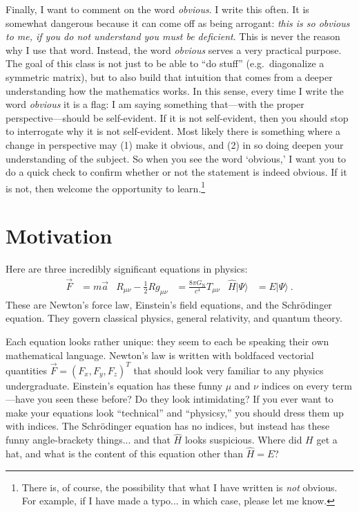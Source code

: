 \documentclass[12pt]{article}
\begin{document}
Finally, I want to comment on the word \emph{obvious}. I write this often. It is somewhat dangerous because it can come off as being arrogant: \emph{this is so obvious to me, if you do not understand you must be deficient}. This is never the reason why I use that word. Instead, the word \emph{obvious} serves a very practical purpose. The goal of this class is not just to be able to ``do stuff'' (e.g.~diagonalize a symmetric matrix), but to also build that intuition that comes from a deeper understanding how the mathematics works. In this sense, every time I write the word \emph{obvious} it is a flag: I am saying something that---with the proper perspective---should be self-evident. If it is not self-evident, then you should stop to interrogate why it is not self-evident. Most likely there is something where a change in perspective may (1) make it obvious, and (2) in so doing deepen your understanding of the subject. So when you see the word `obvious,' I want you to do a quick check to confirm whether or not the statement is indeed obvious. If it is not, then welcome the opportunity to learn.\footnote{There is, of course, the possibility that what I have written is \emph{not} obvious. For example, if I have made a typo... in which case, please let me know.}

\section{Motivation}

Here are three incredibly significant equations in physics:
\begin{align}
    \vec{F} &= m\vec{a}
    &
    R_{\mu\nu} - \frac{1}{2}Rg_{\mu\nu} 
    &= \frac{8\pi G_\text{N}}{c^4} T_{\mu\nu}
    &
    \hat H |\Psi\rangle 
    &= E |\Psi\rangle \ .
    \label{eq:three:equations}
\end{align}
These are Newton's force law, Einstein's field equations, and the Schr\"odinger equation. They govern classical physics, general relativity, and quantum theory. 


Each equation looks rather unique: they seem to each be speaking their own mathematical language. Newton's law is written with boldfaced vectorial quantities $\vec{F} = (F_x, F_y, F_z)^T$ that should look very familiar to any physics undergraduate. Einstein's equation has these funny $\mu$ and $\nu$ indices on every term---have you seen these before? Do they look intimidating? If you ever want to make your equations look ``technical'' and ``physicsy,'' you should dress them up with indices. The Schr\"odinger equation has no indices, but instead has these funny angle-brackety things... and that $\hat H$ looks suspicious. Where did $H$ get a hat, and what is the content of this equation other than $\hat H = E$?
\end{document}
